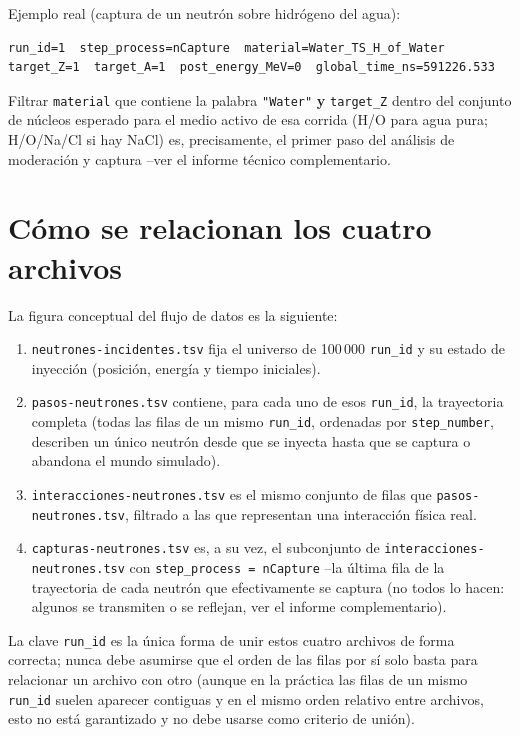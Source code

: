 \documentclass[11pt,a4paper]{article}
\newcommand{\archivo}[1]{\texttt{#1}} %
\newcommand{\var}[1]{\texttt{#1}}
\begin{document}
\noindent Ejemplo real (captura de un neutrón sobre hidrógeno del agua):
\begin{lstlisting}
run_id=1  step_process=nCapture  material=Water_TS_H_of_Water  target_Z=1  target_A=1  post_energy_MeV=0  global_time_ns=591226.533
\end{lstlisting}

\noindent Filtrar \var{material} que contiene la palabra \var{"Water"} \textbf{y} \var{target\_Z}
dentro del conjunto de núcleos esperado para el medio activo de esa corrida (H/O para agua pura;
H/O/Na/Cl si hay NaCl) es, precisamente, el primer paso del análisis de moderación y captura --ver
el informe técnico complementario.

\section{Cómo se relacionan los cuatro archivos}

La figura conceptual del flujo de datos es la siguiente:

\begin{enumerate}
  \item \archivo{neutrones-incidentes.tsv} fija el universo de 100\,000 \var{run\_id} y su estado
  de inyección (posición, energía y tiempo iniciales).
  \item \archivo{pasos-neutrones.tsv} contiene, para cada uno de esos \var{run\_id}, la trayectoria
  completa (todas las filas de un mismo \var{run\_id}, ordenadas por \var{step\_number}, describen
  un único neutrón desde que se inyecta hasta que se captura o abandona el mundo simulado).
  \item \archivo{interacciones-neutrones.tsv} es el mismo conjunto de filas que
  \archivo{pasos-neutrones.tsv}, filtrado a las que representan una interacción física real.
  \item \archivo{capturas-neutrones.tsv} es, a su vez, el subconjunto de
  \archivo{interacciones-neutrones.tsv} con \var{step\_process = nCapture} --la última fila de la
  trayectoria de cada neutrón que efectivamente se captura (no todos lo hacen: algunos se
  transmiten o se reflejan, ver el informe complementario).
\end{enumerate}

La clave \var{run\_id} es la única forma de unir estos cuatro archivos de forma correcta; nunca debe
asumirse que el orden de las filas por sí solo basta para relacionar un archivo con otro (aunque en
la práctica las filas de un mismo \var{run\_id} suelen aparecer contiguas y en el mismo orden
relativo entre archivos, esto no está garantizado y no debe usarse como criterio de unión).
\end{document}
